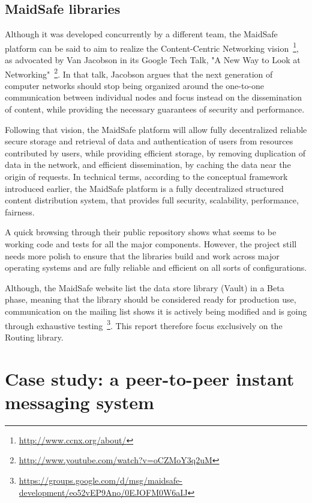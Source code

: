 \subsection{MaidSafe libraries}

Although it was developed concurrently by a different team, the MaidSafe platform can be said to aim to realize the Content-Centric Networking vision~\footnote{\url{http://www.ccnx.org/about/}}, as advocated by Van Jacobson in its Google Tech Talk, "A New Way to Look at Networking"~\footnote{\url{http://www.youtube.com/watch?v=oCZMoY3q2uM}}. In that talk, Jacobson argues that the next generation of computer networks should stop being organized around the one-to-one communication between individual nodes and focus instead on the dissemination of content, while providing the necessary guarantees of security and performance.

Following that vision, the MaidSafe platform will allow fully decentralized reliable secure storage and retrieval of data and authentication of users from resources contributed by users, while providing efficient storage, by removing duplication of data in the network, and efficient dissemination, by caching the data near the origin of requests. In technical terms, according to the conceptual framework introduced earlier, the MaidSafe platform is a fully decentralized structured content distribution system, that provides full security, scalability, performance, fairness.

A quick browsing through their public repository shows what seems to be working code and tests for all the major components. However, the project still needs more polish to ensure that the libraries build and work across major operating systems and are fully reliable and efficient on all sorts of configurations.

Although, the MaidSafe website list the data store library (Vault) in a Beta phase, meaning that the library should be considered ready for production use, communication on the mailing list shows it is actively being modified and is going through exhaustive testing~\footnote{\url{https://groups.google.com/d/msg/maidsafe-development/eo52vEP9Ano/0EJOFM0W6aIJ}}. This report therefore focus exclusively on the Routing library.

\section{Case study: a peer-to-peer instant messaging system}


